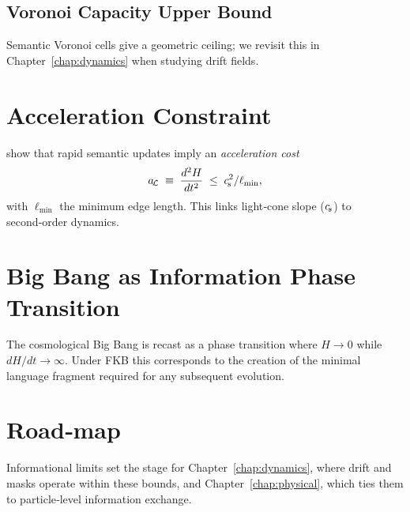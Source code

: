 \subsection{Voronoi Capacity Upper Bound}
Semantic Voronoi cells give a geometric ceiling; we revisit this in Chapter~\ref{chap:dynamics} when studying drift fields.

\section{Acceleration Constraint}

\textcite{accelleration2025} show that rapid semantic updates imply an \emph{acceleration cost}
\begin{equation}
  a_{\!\mathcal L}\;\equiv\;\frac{d^2 H}{dt^2}\;\le\;c_{\!s}^2/\ell_{\min},
\end{equation}
with $\ell_{\min}$ the minimum edge length.  This links light‑cone slope ($c_{\!s}$) to second‑order dynamics.

\section{Big Bang as Information Phase Transition}
The cosmological Big Bang is recast as a phase transition where $H\to 0$ while $dH/dt\to\infty$.  Under FKB this corresponds to the creation of the minimal language fragment required for any subsequent evolution.

\section{Road‑map}
Informational limits set the stage for Chapter~\ref{chap:dynamics}, where drift and masks operate within these bounds, and Chapter~\ref{chap:physical}, which ties them to particle‑level information exchange.

\clearpage
